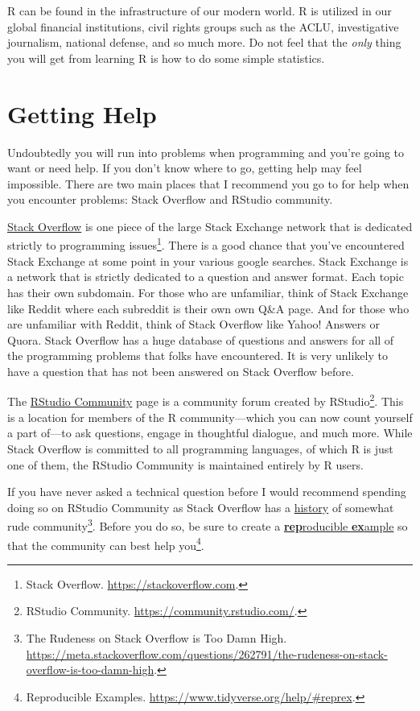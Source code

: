 \documentclass[
]{book}
\begin{document}
R can be found in the infrastructure of our modern world. R is utilized in our global financial institutions, civil rights groups such as the ACLU, investigative journalism, national defense, and so much more. Do not feel that the \emph{only} thing you will get from learning R is how to do some simple statistics.

\hypertarget{getting-help}{%
\section{Getting Help}\label{getting-help}}

Undoubtedly you will run into problems when programming and you're going to want or need help. If you don't know where to go, getting help may feel impossible. There are two main places that I recommend you go to for help when you encounter problems: Stack Overflow and RStudio community.

\href{https://stackoverflow.com}{Stack Overflow} is one piece of the large Stack Exchange network that is dedicated strictly to programming issues\footnote{Stack Overflow. \url{https://stackoverflow.com}.}. There is a good chance that you've encountered Stack Exchange at some point in your various google searches. Stack Exchange is a network that is strictly dedicated to a question and answer format. Each topic has their own subdomain. For those who are unfamiliar, think of Stack Exchange like Reddit where each subreddit is their own own Q\&A page. And for those who are unfamiliar with Reddit, think of Stack Overflow like Yahoo! Answers or Quora. Stack Overflow has a huge database of questions and answers for all of the programming problems that folks have encountered. It is very unlikely to have a question that has not been answered on Stack Overflow before.

The \href{https://community.rstudio.com/}{RStudio Community} page is a community forum created by RStudio\footnote{RStudio Community. \url{https://community.rstudio.com/}.}. This is a location for members of the R community---which you can now count yourself a part of---to ask questions, engage in thoughtful dialogue, and much more. While Stack Overflow is committed to all programming languages, of which R is just one of them, the RStudio Community is maintained entirely by R users.

If you have never asked a technical question before I would recommend spending doing so on RStudio Community as Stack Overflow has a \href{https://meta.stackoverflow.com/questions/262791/the-rudeness-on-stack-overflow-is-too-damn-high}{history} of somewhat rude community\footnote{The Rudeness on Stack Overflow is Too Damn High. \url{https://meta.stackoverflow.com/questions/262791/the-rudeness-on-stack-overflow-is-too-damn-high}.}. Before you do so, be sure to create a \href{https://www.tidyverse.org/help/\#reprex}{\textbf{rep}roducible \textbf{ex}ample} so that the community can best help you\footnote{Reproducible Examples. \url{https://www.tidyverse.org/help/\#reprex}.}.
\end{document}
